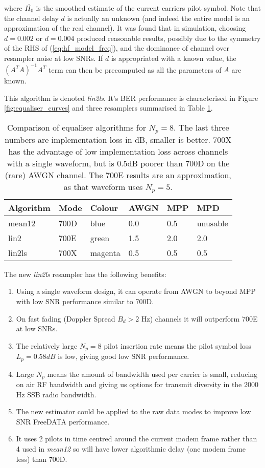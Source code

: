 \documentclass{article}
\begin{document}
where $\overline{H_0}$ is the smoothed estimate of the current carriers pilot symbol.  Note that the channel delay $d$ is actually an unknown (and indeed the entire model is an approximation of the real channel). It was found that in simulation, choosing $d=0.002$ or $d=0.004$ produced reasonable results, possibly due to the symmetry of the RHS of (\ref{eq:hf_model_freq}), and the dominance of channel over resampler noise at low SNRs. If $d$ is appropriated with a known value, the $(A^TA)^{-1}A^T$ term can then be precomputed as all the parameters of $A$ are known.

This algorithm is denoted \emph{lin2ls}.  It's BER performance is characterised in Figure \ref{fig:equaliser_curves} and three resamplers summarised in Table \ref{tab:resampler_summary}.

\begin{table}[h]
\label{tab:resampler_summary}
\centering
\begin{tabular}{l l l l l l }
 \hline
 Algorithm & Mode & Colour & AWGN & MPP & MPD \\
 \hline
 mean12 & 700D & blue & 0.0 & 0.5 & unusable \\
 lin2 & 700E & green & 1.5 & 2.0 & 2.0 \\
 lin2ls & 700X & magenta & 0.5 & 0.5 & 0.5 \\
 \hline
\end{tabular}
\caption{Comparison of equaliser algorithms for $N_p=8$. The last three numbers are implementation loss in dB, smaller is better.  700X has the advantage of low implementation loss across channels with a single waveform, but is 0.5dB poorer than 700D on the (rare) AWGN channel.  The 700E results are an approximation, as that waveform uses $N_p=5$. }
\end{table}

The new \emph{lin2ls} resampler has the following benefits:
\begin{enumerate}
\item Using a single waveform design, it can operate from AWGN to beyond MPP with low SNR performance similar to 700D.
\item On fast fading (Doppler Spread $B_d>2$ Hz) channels it will outperform 700E at low SNRs.
\item The relatively large $N_p=8$ pilot insertion rate means the pilot symbol loss $L_p=0.58 \si{dB}$ is low, giving good low SNR performance.
\item Large $N_p$ means the amount of bandwidth used per carrier is small, reducing on air RF bandwidth and giving us options for transmit diversity in the 2000 Hz SSB radio bandwidth.
\item The new estimator could be applied to the raw data modes to improve low SNR FreeDATA performance.
\item It uses 2 pilots in time centred around the current modem frame rather than 4 used in \emph{mean12} so will have lower algorithmic delay (one modem frame less) than 700D.
\end{enumerate}	
\end{document}
